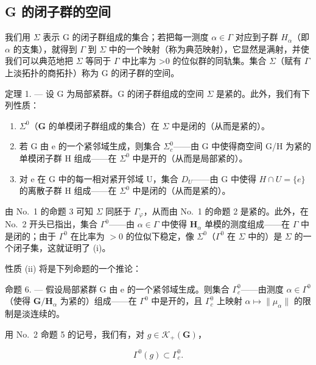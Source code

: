 \subsection{G 的闭子群的空间}

我们用 \(\Sigma\) 表示 G 的闭子群组成的集合；若把每一测度 \(\alpha\in\Gamma\) 对应到子群 \(H_{\alpha}\)（即 \(\alpha\) 的支集），就得到 \(\Gamma\) 到 \(\Sigma\) 中的一个映射（称为典范映射），它显然是满射，并使我们可以典范地把 \(\Sigma\) 等同于 \(\Gamma\) 中比率为 \textgreater0 的位似群的同轨集。集合 \(\Sigma\)（赋有 \(\Gamma\) 上淡拓扑的商拓扑）称为 G 的闭子群的空间。

定理 1. --- 设 G 为局部紧群。G 的闭子群组成的空间 \(\Sigma\) 是紧的。此外，我们有下列性质：

\begin{enumerate}
\def\labelenumi{(\roman{enumi})}
\item
  \(\Sigma^0\)（\(\mathbf{G}\) 的单模闭子群组成的集合）在 \(\Sigma\) 中是闭的（从而是紧的）。
\item
  若 G 由 e 的一个紧邻域生成，则集合 \(\Sigma_{c}^{0}\)——由 G 中使得商空间 G/H 为紧的单模闭子群 H 组成——在 \(\Sigma^{0}\) 中是开的（从而是局部紧的）。
\item
  对 e 在 G 中的每一相对紧开邻域 U，集合 \(D_{U}\)——由 G 中使得 \(H \cap U = \{e\}\) 的离散子群 H 组成——在 \(\Sigma^{0}\) 中是闭的（从而是紧的）。
\end{enumerate}

由 No.~1 的命题 3 可知 \(\Sigma\) 同胚于 \(\Gamma_{\varphi}\)，从而由 No.~1 的命题 2 是紧的。此外，在 No.~2 开头已指出，集合 \(\Gamma^0\)——由 \(\alpha \in \Gamma\) 中使得 \(\mathbf{H}_{\alpha}\) 单模的测度组成——在 \(\Gamma\) 中是闭的；由于 \(\Gamma^0\) 在比率为 \(>0\) 的位似下稳定，像 \(\Sigma^0\)（\(\Gamma^0\) 在 \(\Sigma\) 中的）是 \(\Sigma\) 的一个闭子集，这就证明了 (i)。

性质 (ii) 将是下列命题的一个推论：

命题 6. --- 假设局部紧群 G 由 e 的一个紧邻域生成。则集合 \(\Gamma_{c}^{0}\)——由测度 \(\alpha\in\Gamma^{0}\)（使得 \(\mathbf{G} / \mathbf{H}_{\alpha}\) 为紧的）组成——在 \(\Gamma^0\) 中是开的，且 \(\Gamma_c^0\) 上映射 \(\alpha \mapsto \| \mu_{\alpha}\|\) 的限制是淡连续的。

用 No.~2 命题 5 的记号，我们有，对 \(g \in \mathcal{K}_{+}(\mathbf{G})\)，

\[
\Gamma^ {0} (g) \subset \Gamma_ {c} ^ {0}.\tag{6}
\]

